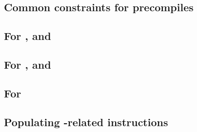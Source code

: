 \subsection{Common constraints for precompiles}                            \label{oob: precompiles: common precompiles: generalities}           \newpage
\subsection{For \oobInstEcrecover{}, \oobInstEcadd{} and \oobInstEcmul{}}  \label{oob: precompiles: common precompiles: one row precompiles}             \newpage
\subsection{For \oobInstShaTwo{}, \oobInstRipemd{} and \oobInstIdentity{}} \label{oob: precompiles: common precompiles: two row precompiles}             \newpage
\subsection{For \oobInstEcpairing{}}                                       \label{oob: precompiles: common precompiles: three row precompiles}           \newpage
\subsection{Populating -related \oobMod{} instructions}          \label{oob: populating: bls}                                           \newpage                        
